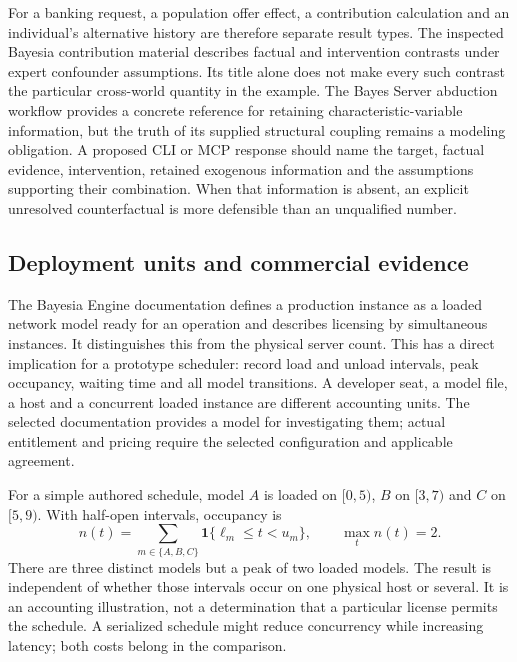 For a banking request, a population offer effect, a contribution calculation
and an individual's alternative history are therefore separate result
types. The inspected Bayesia contribution material describes factual and
intervention contrasts under expert confounder assumptions. Its title alone
does not make every such contrast the particular cross-world quantity in
the example. The Bayes Server abduction workflow provides a concrete
reference for retaining characteristic-variable information, but the truth
of its supplied structural coupling remains a modeling obligation. A
proposed CLI or MCP response should name the target, factual evidence,
intervention, retained exogenous information and the assumptions supporting
their combination. When that information is absent, an explicit unresolved
counterfactual is more defensible than an unqualified number.
\citep{exec13_ci_bayesia_counterfactual,exec13_ci_bayesserver_causality,exec25_bn_commercial_choice}

\subsection{Deployment units and commercial evidence}

The Bayesia Engine documentation defines a production instance as a loaded
network model ready for an operation and describes licensing by simultaneous
instances. It distinguishes this from the physical server count. This has
a direct implication for a prototype scheduler: record load and unload
intervals, peak occupancy, waiting time and all model transitions. A
developer seat, a model file, a host and a concurrent loaded instance are
different accounting units. The selected documentation provides a model
for investigating them; actual entitlement and pricing require the
selected configuration and applicable agreement.
\citep{exec13_bayesia_api,exec13_bayesia_professional}

For a simple authored schedule, model $A$ is loaded on $[0,5)$, $B$ on
$[3,7)$ and $C$ on $[5,9)$. With half-open intervals, occupancy is
\[
 n(t)=\sum_{m\in\{A,B,C\}}\mathbf1
       \{\ell_m\le t<u_m\},\qquad \max_t n(t)=2.
\]
There are three distinct models but a peak of two loaded models. The result
is independent of whether those intervals occur on one physical host or
several. It is an accounting illustration, not a determination that a
particular license permits the schedule. A serialized schedule might reduce
concurrency while increasing latency; both costs belong in the comparison.
\citep{exec25_bn_commercial_choice}

